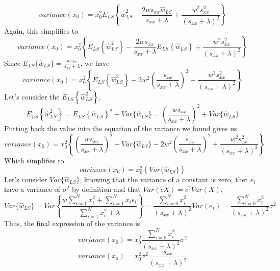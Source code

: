 \documentclass[12pt,titlepage]{article}
\begin{document}
\begin{enumerate}
    $$ variance(x_{0}) = x_{0}^{2} E_{LS} \left\{\hat{w}_{LS}^{2} - \frac{2 w s_{xx} \hat{w}_{LS}}{s_{xx} + \lambda} + \frac{w^{2} s_{xx}^{2}}{(s_{xx} + \lambda)^{2}} \right\} $$
    Again, this simplifies to
    $$ variance(x_{0}) = x_{0}^{2} \left\{ E_{LS} \left\{\hat{w}_{LS}^{2}\right\} - \frac{2 w s_{xx}}{s_{xx} + \lambda}E_{LS} \left\{\hat{w}_{LS}\right\} + \frac{w^{2} s_{xx}^{2}}{(s_{xx} + \lambda)^{2}} \right\} $$
    Since $E_{LS}\{\hat{w}_{LS}\} = \frac{w s_{xx}}{s_{xx} + \lambda}$, we have
    $$ variance(x_{0}) = x_{0}^{2} \left\{ E_{LS} \left\{\hat{w}_{LS}^{2}\right\} - 2w^{2}\left(\frac{s_{xx}}{s_{xx} + \lambda}\right)^{2}  + \frac{w^{2} s_{xx}^{2}}{(s_{xx} + \lambda)^{2}} \right\} $$
    Let's consider the $E_{LS} \left\{ \hat{w}_{LS}^{2} \right\}$,
    $$ E_{LS} \left\{ \hat{w}_{LS}^{2} \right\} = E_{LS} \left\{ \hat{w}_{LS} \right\}^{2} + Var\{\hat{w}_{LS}\} = \left( \frac{w s_{xx}}{s_{xx} + \lambda} \right)^{2} + Var\{\hat{w}_{LS}\}$$
    Putting back the value into the equation of the variance we found gives us
    $$ variance(x_{0}) = x_{0}^{2} \left\{ \left( \frac{w s_{xx}}{s_{xx} + \lambda} \right)^{2} + Var\{\hat{w}_{LS}\} - 2w^{2}\left(\frac{s_{xx}}{s_{xx} + \lambda}\right)^{2}  + \frac{w^{2} s_{xx}^{2}}{(s_{xx} + \lambda)^{2}} \right\} $$
    Which simplifies to
    $$ variance(x_{0}) = x_{0}^{2} \left\{ Var\{\hat{w}_{LS}\} \right\} $$
    Let's consider $Var\{\hat{w}_{LS}\}$, knowing that the variance of a constant is zero, thet $e_{i}$ have a variance of $\sigma^{2}$ by definition and that $Var(cX) = c^{2} Var(X)$,
    $$ Var\{\hat{w}_{LS}\} = Var \left\{ \frac{w \sum_{i=1}^{N} x_{i}^{2} + \sum_{i=1}^{N} x_{i} \epsilon_{i}}{\sum_{i=1}^{N} x_{i}^{2} + \lambda} \right\} = \frac{\sum_{i=0}^{N} x_{i}^{2}}{(s_{xx} + \lambda)^{2}} Var(e_{i}) = \frac{\sum_{i=0}^{N} x_{i}^{2}}{(s_{xx} + \lambda)^{2}} \sigma^{2}$$
    Thus, the final expression of the variance is 
    $$ variance(x_{0}) = x_{0}^{2} \frac{\sum_{i=0}^{N} x_{i}^{2}}{(s_{xx} + \lambda)^{2}} \sigma^{2} $$
    $$ variance(x_{0}) = x_{0}^{2} \sigma^{2} \frac{s_{xx}}{(s_{xx} + \lambda)^{2}} $$
    
\end{enumerate}
\end{document}
